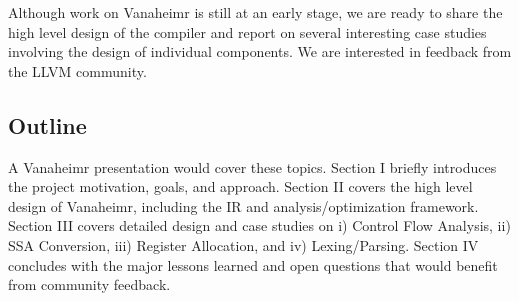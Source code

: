 \documentclass[conference, 10pt]{IEEEtran}
\begin{document}
Although work on Vanaheimr is still at an early stage, we are ready to share
the high level design of the compiler and report on several interesting case
studies involving the design of individual components.  We are interested in
feedback from the LLVM community.


\subsection{Outline}

A Vanaheimr presentation would cover these topics. Section I briefly introduces
the project motivation, goals, and approach.
Section II covers the high level design of Vanaheimr, including the IR and
analysis/optimization framework.  Section III covers detailed design and case
studies on i) Control Flow Analysis, ii) SSA Conversion, iii) Register
Allocation, and iv) Lexing/Parsing.  Section IV concludes with the major lessons
learned and open questions that would benefit from community feedback.



\end{document}
